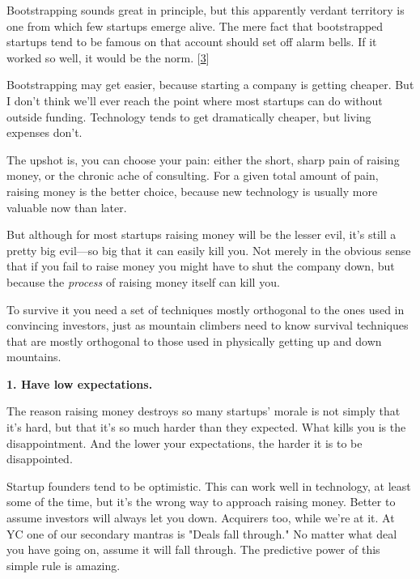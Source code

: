 Bootstrapping
                    sounds great in principle, but this apparently verdant
                    territory is one from which few startups emerge alive. The
                    mere fact that bootstrapped startups tend to be famous on
                    that account should set off alarm bells. If it worked so
                    well, it would be the norm.
                    [\href{\#f3n}{3}]


                    Bootstrapping may get easier, because starting a company is
                    getting cheaper. But I don't think we'll ever reach the
                    point where most startups can do without outside funding.
                    Technology tends to get dramatically cheaper, but living
                    expenses don't.

The upshot is, you can choose
                    your pain: either the short, sharp pain of raising money, or
                    the chronic ache of consulting. For a given total amount of
                    pain, raising money is the better choice, because new
                    technology is usually more valuable now than later.

But
                    although for most startups raising money will be the lesser
                    evil, it's still a pretty big evil---so big that it can
                    easily kill you. Not merely in the obvious sense that if you
                    fail to raise money you might have to shut the company down,
                    but because the \emph{process} of raising money itself can
                    kill you.

To survive it you need a set of
                    techniques mostly orthogonal to the ones used in convincing
                    investors, just as mountain climbers need to know survival
                    techniques that are mostly orthogonal to those used in
                    physically getting up and down mountains.


                    \textbf{1. Have low expectations.}

The reason
                    raising money destroys so many startups' morale is not
                    simply that it's hard, but that it's so much harder than
                    they expected. What kills you is the disappointment. And the
                    lower your expectations, the harder it is to be
                    disappointed.

Startup founders tend to be
                    optimistic. This can work well in technology, at least some
                    of the time, but it's the wrong way to approach raising
                    money. Better to assume investors will always let you down.
                    Acquirers too, while we're at it. At YC one of our secondary
                    mantras is "Deals fall through." No matter what deal you
                    have going on, assume it will fall through. The predictive
                    power of this simple rule is amazing.

